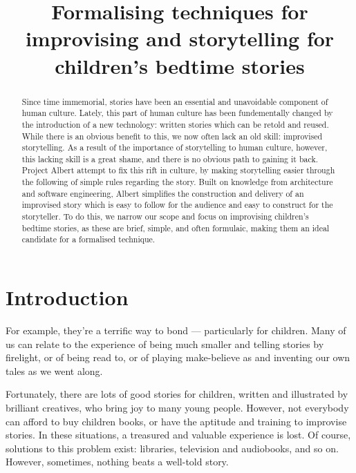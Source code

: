\documentclass{tufte-handout}
\title{Formalising techniques for improvising and storytelling for children's bedtime stories}
\begin{document}
\maketitle
\begin{abstract}
    Since time immemorial, stories have been an essential and unavoidable component of human culture. Lately, this part of human culture has been fundementally changed by the introduction of a new technology: written stories which can be retold and reused.
    While there is an obvious benefit to this, we now often lack an old skill: improvised storytelling. As a result of the importance of storytelling to human culture, however, this lacking skill is a great shame, and there is no obvious path to gaining it back. 
    Project Albert attempt to fix this rift in culture, by making storytelling easier through the following of simple rules regarding the story. Built on knowledge from architecture and software engineering, Albert simplifies the construction and delivery of an improvised story which is easy to follow for the audience and easy to construct for the storyteller. To do this, we narrow our scope and focus on improvising children's bedtime stories, as these are brief, simple, and often formulaic, making them an ideal candidate for a formalised technique.
\end{abstract}
\section{Introduction}
 For example, they're a terrific way to bond --- particularly for children. Many of us can relate to the experience of being much smaller and telling stories by firelight, or of being read to, or of playing make-believe as and inventing our own tales as we went along. \par

Fortunately, there are lots of good stories for children, written and illustrated by brilliant creatives, who bring joy to many young people. However, not everybody can afford to buy children books, or have the aptitude and training to improvise stories. In these situations, a treasured and valuable experience is lost. Of course, solutions to this problem exist: libraries, television and audiobooks, and so on. However, sometimes, nothing beats a well-told story.\par
\end{document}
